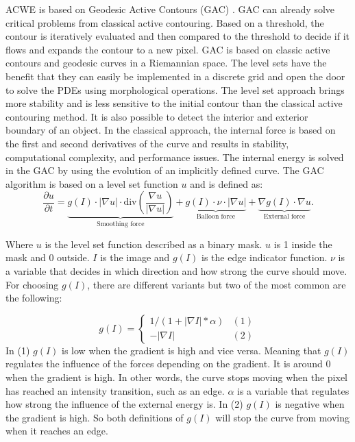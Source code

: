 ACWE is based on Geodesic Active Contours (GAC) \cite{}. GAC can already solve critical problems from classical active contouring. Based on a threshold, the contour is iteratively evaluated and then compared to the threshold to decide if it flows and expands the contour to a new pixel. GAC is based on classic active contours and geodesic curves in a Riemannian space. The level sets have the benefit that they can easily be implemented in a discrete grid and open the door to solve the PDEs using morphological operations. The level set approach brings more stability and is less sensitive to the initial contour than the classical active contouring method. It is also possible to detect the interior and exterior boundary of an object. In the classical approach, the internal force is based on the first and second derivatives of the curve and results in stability, computational complexity, and performance issues. The internal energy is solved in the GAC by using the evolution of an implicitly defined curve. The GAC algorithm is based on a level set function $u$ and is defined as:
\begin{equation}
    \frac{\partial u}{\partial t} = 
    \underbrace{g(I) \cdot |\nabla u| \cdot \text{div} \left(\frac{\nabla u}{|\nabla u|}\right)}_{\text{Smoothing force}} 
    + \underbrace{g(I) \cdot \nu \cdot |\nabla u|}_{\text{Balloon force}} 
    + \underbrace{\nabla g(I) \cdot \nabla u}_{\text{External force}}.
    \label{deform}
    \end{equation}
    
Where $u$ is the level set function described as a binary mask. $u$ is 1 inside the mask and 0 outside. $I$ is the image and $g(I)$ is the edge indicator function. $\nu$ is a variable that decides in which direction and how strong the curve should move. 
For choosing $g(I)$, there are different variants but two of the most common are the following: 

\begin{equation}
    g(I) = \begin{cases}
     1/(1 + |\nabla I|*\alpha) &(1)\\
     -|\nabla I| &(2)
    \end{cases}
\end{equation}
In (1) $g(I)$ is low when the gradient is high and vice versa. Meaning that $g(I)$ regulates the influence of the forces depending on the gradient. It is around 0 when the gradient is high. In other words, the curve stops moving when the pixel has reached an intensity transition, such as an edge. $\alpha$ is a variable that regulates how strong the influence of the external energy is. In (2) $g(I)$ is negative when the gradient is high. So both definitions of $g(I)$ will stop the curve from moving when it reaches an edge.

